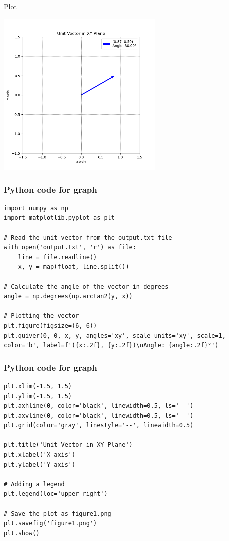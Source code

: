 \documentclass{beamer}
\begin{document}
\begin{frame}{Plot}
    \begin{center}
\includegraphics[width=0.6\textwidth]{figs/figure1.png}
\end{center}
\end{frame}

\begin{frame}[fragile]
\frametitle{Python code for graph}
\begin{verbatim}
import numpy as np
import matplotlib.pyplot as plt

# Read the unit vector from the output.txt file
with open('output.txt', 'r') as file:
    line = file.readline()
    x, y = map(float, line.split())

# Calculate the angle of the vector in degrees
angle = np.degrees(np.arctan2(y, x))

# Plotting the vector
plt.figure(figsize=(6, 6))
plt.quiver(0, 0, x, y, angles='xy', scale_units='xy', scale=1, 
color='b', label=f'({x:.2f}, {y:.2f})\nAngle: {angle:.2f}°')
\end{verbatim}
\end{frame}
\begin{frame}[fragile]
\frametitle{Python code for graph}
\begin{verbatim}
plt.xlim(-1.5, 1.5)
plt.ylim(-1.5, 1.5)
plt.axhline(0, color='black', linewidth=0.5, ls='--')
plt.axvline(0, color='black', linewidth=0.5, ls='--')
plt.grid(color='gray', linestyle='--', linewidth=0.5)

plt.title('Unit Vector in XY Plane')
plt.xlabel('X-axis')
plt.ylabel('Y-axis')

# Adding a legend
plt.legend(loc='upper right')

# Save the plot as figure1.png
plt.savefig('figure1.png')
plt.show()
\end{verbatim}
\end{frame}
\end{document}

